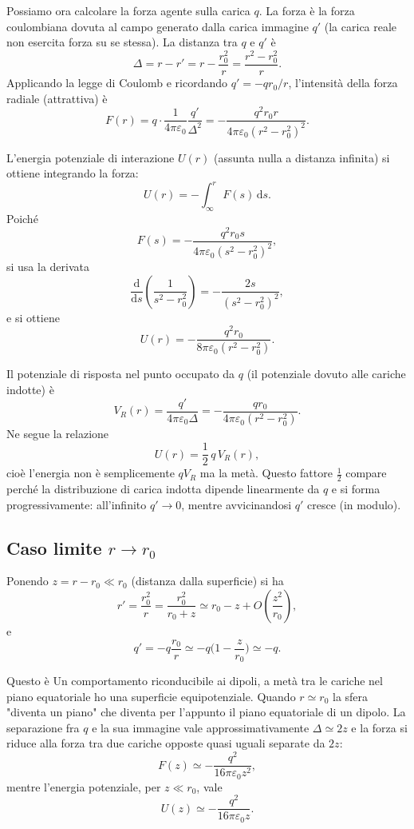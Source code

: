 \documentclass{book}
\begin{document}
Possiamo ora calcolare la forza agente sulla carica $q$. La forza è la forza coulombiana dovuta al campo generato dalla carica immagine $q'$ (la carica reale non esercita forza su se stessa). La distanza tra $q$ e $q'$ è
\[
\Delta = r - r' = r - \frac{r_0^2}{r} = \frac{r^2-r_0^2}{r}.
\]
Applicando la legge di Coulomb e ricordando $q'=-q r_0/r$, l'intensità della forza radiale (attrattiva) è
\[
F(r) = q\cdot \frac{1}{4\pi\varepsilon_0}\frac{q'}{\Delta^{2}}
= -\frac{q^{2}r_{0}r}{4\pi\varepsilon_{0}(r^{2}-r_{0}^{2})^{2}}.
\]

L'energia potenziale di interazione $U(r)$ (assunta nulla a distanza infinita) si ottiene integrando la forza:
\[
U(r) = -\int_{\infty}^{r} F(s)\,\mathrm{d}s.
\]
Poiché
\[
F(s) = -\frac{q^{2}r_{0}s}{4\pi\varepsilon_{0}(s^{2}-r_0^{2})^{2}},
\]
si usa la derivata
\[
\frac{\mathrm{d}}{\mathrm{d}s}\!\left(\frac{1}{s^{2}-r_0^{2}}\right) = -\frac{2s}{(s^{2}-r_0^{2})^{2}},
\]
e si ottiene
\[
U(r) = -\frac{q^{2}r_{0}}{8\pi\varepsilon_{0}(r^{2}-r_{0}^{2})}.
\]

Il potenziale di risposta nel punto occupato da $q$ (il potenziale dovuto alle cariche indotte) è
\[
V_{R}(r)=\frac{q'}{4\pi\varepsilon_0\Delta} = -\frac{q r_0}{4\pi\varepsilon_0 (r^{2}-r_0^{2})}.
\]
Ne segue la relazione
\[
U(r) = \frac{1}{2}\, q\,V_{R}(r),
\]
cioè l'energia non è semplicemente $qV_R$ ma la metà. Questo fattore $\tfrac12$ compare perché la distribuzione di carica indotta dipende linearmente da $q$ e si forma progressivamente: all'infinito $q'\to 0$, mentre avvicinandosi $q'$ cresce (in modulo). 
\subsection{Caso limite $r \to r_0$}

Ponendo $z=r-r_0\ll r_0$ (distanza dalla superficie) si ha
\[
r'=\frac{r_0^{2}}{r}=\frac{r_0^{2}}{r_0+z}\simeq r_0 - z + O\!\left(\frac{z^{2}}{r_0}\right),
\]
e
\[
q'=-q\frac{r_0}{r}\simeq -q\Big(1-\frac{z}{r_0}\Big)\simeq -q.
\]

Questo è Un comportamento riconducibile ai dipoli, a metà tra le cariche nel piano equatoriale ho una superficie equipotenziale. Quando $r\simeq r_0$ la sfera "diventa un piano" che diventa per l'appunto il piano equatoriale di un dipolo.
La separazione fra $q$ e la sua immagine vale approssimativamente $\Delta\simeq 2z$ e la forza si riduce alla forza tra due cariche opposte quasi uguali separate da $2z$:
\[
F(z)\simeq -\frac{q^{2}}{16\pi\varepsilon_0 z^{2}},
\]
mentre l'energia potenziale, per $z\ll r_0$, vale
\[
U(z)\simeq -\frac{q^{2}}{16\pi\varepsilon_0 z}.
\]
\end{document}
